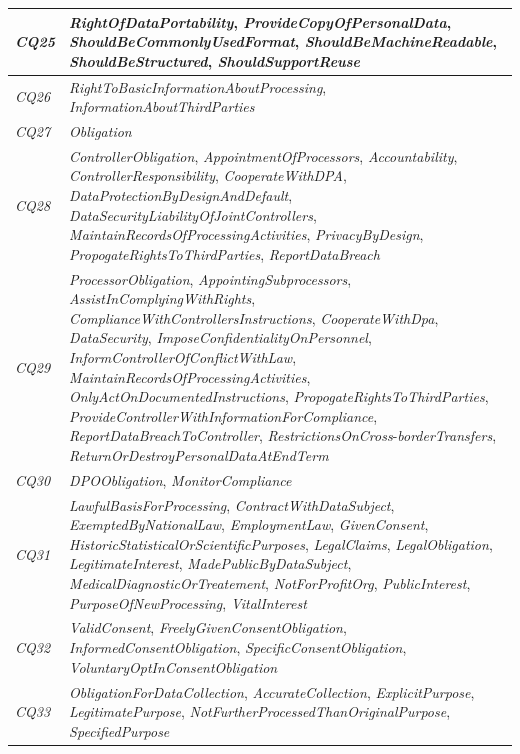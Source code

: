 \begin{table}[htbp]
\begin{tabularx}{\textwidth}{|l|X|}
\textit{CQ25} & \textit{RightOfDataPortability}, \textit{ProvideCopyOfPersonalData}, \textit{ShouldBeCommonlyUsedFormat}, \textit{ShouldBeMachineReadable}, \textit{ShouldBeStructured}, \textit{ShouldSupportReuse}  \\ \hline
\textit{CQ26} & \textit{RightToBasicInformationAboutProcessing}, \textit{InformationAboutThirdParties}  \\ \hline
\textit{CQ27} & \textit{Obligation} \\ \hline
\textit{CQ28} & \textit{ControllerObligation}, \textit{AppointmentOfProcessors}, \textit{Accountability}, \textit{ControllerResponsibility}, \textit{CooperateWithDPA}, \textit{DataProtectionByDesignAndDefault}, \textit{DataSecurityLiabilityOfJointControllers}, \textit{MaintainRecordsOfProcessingActivities}, \textit{PrivacyByDesign}, \textit{PropogateRightsToThirdParties}, \textit{ReportDataBreach} \\ \hline
\textit{CQ29} & \textit{ProcessorObligation}, \textit{AppointingSubprocessors}, \textit{AssistInComplyingWithRights}, \textit{ComplianceWithControllersInstructions}, \textit{CooperateWithDpa}, \textit{DataSecurity}, \textit{ImposeConfidentialityOnPersonnel}, \textit{InformControllerOfConflictWithLaw}, \textit{MaintainRecordsOfProcessingActivities}, \textit{OnlyActOnDocumentedInstructions}, \textit{PropogateRightsToThirdParties}, \textit{ProvideControllerWithInformationForCompliance}, \textit{ReportDataBreachToController}, \textit{RestrictionsOnCross}-\textit{borderTransfers}, \textit{ReturnOrDestroyPersonalDataAtEndTerm} \\ \hline
\textit{CQ30} & \textit{DPOObligation}, \textit{MonitorCompliance} \\ \hline
\textit{CQ31} & \textit{LawfulBasisForProcessing}, \textit{ContractWithDataSubject}, \textit{ExemptedByNationalLaw}, \textit{EmploymentLaw}, \textit{GivenConsent}, \textit{HistoricStatisticalOrScientificPurposes}, \textit{LegalClaims}, \textit{LegalObligation}, \textit{LegitimateInterest}, \textit{MadePublicByDataSubject}, \textit{MedicalDiagnosticOrTreatement}, \textit{NotForProfitOrg}, \textit{PublicInterest}, \textit{PurposeOfNewProcessing}, \textit{VitalInterest} \\ \hline
\textit{CQ32} & \textit{ValidConsent}, \textit{FreelyGivenConsentObligation}, \textit{InformedConsentObligation}, \textit{SpecificConsentObligation}, \textit{VoluntaryOptInConsentObligation}  \\ \hline
\textit{CQ33} & \textit{ObligationForDataCollection}, \textit{AccurateCollection}, \textit{ExplicitPurpose}, \textit{LegitimatePurpose}, \textit{NotFurtherProcessedThanOriginalPurpose}, \textit{SpecifiedPurpose} \\ \hline

\end{tabularx}
\end{table}
